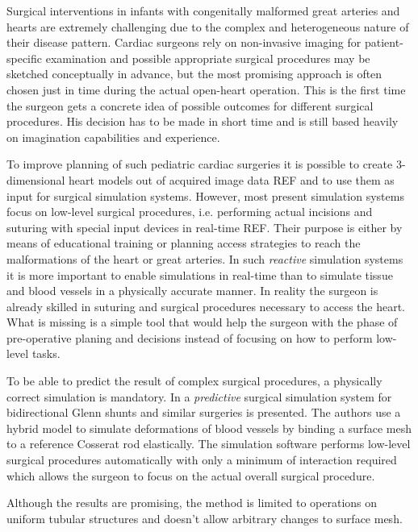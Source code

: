 Surgical interventions in infants with congenitally malformed great arteries and hearts are extremely challenging due to the complex and heterogeneous nature of their disease pattern. Cardiac surgeons rely on non-invasive imaging for patient-specific examination and possible appropriate surgical procedures may be sketched conceptually in advance, but the most promising approach is often chosen just in time during the actual open-heart operation. This is the first time the surgeon gets a concrete idea of possible outcomes for different surgical procedures. His decision has to be made in short time and is still based heavily on imagination capabilities and experience.

To improve planning of such pediatric cardiac surgeries it is possible to create 3-dimensional heart models out of acquired image data REF and to use them as input for surgical simulation systems.
However, most present simulation systems focus on low-level surgical procedures, i.e. performing actual incisions and suturing with special input devices in real-time REF. Their purpose is either by means of educational training or planning access strategies to reach the malformations of the heart or great arteries. In such {\itshape reactive} simulation systems it is more important to enable simulations in real-time than to simulate tissue and blood vessels in a physically accurate manner.
In reality the surgeon is already skilled in suturing and surgical procedures necessary to access the heart.
What is missing is a simple tool that would help the surgeon with the phase of pre-operative planing and decisions instead of focusing on how to perform low-level tasks.

To be able to predict the result of complex surgical procedures, a physically correct simulation is mandatory.
In \cite{Li2009} a {\itshape predictive} surgical simulation system for bidirectional Glenn shunts and similar surgeries is presented.
The authors use a hybrid model to simulate deformations of blood vessels by binding a surface mesh to a reference Cosserat rod elastically.
The simulation software performs low-level surgical procedures automatically with only a minimum of interaction required which allows the surgeon to focus on the actual overall surgical procedure.

Although the results are promising, the method is limited to operations on uniform tubular structures and doesn't allow arbitrary changes to surface mesh.

